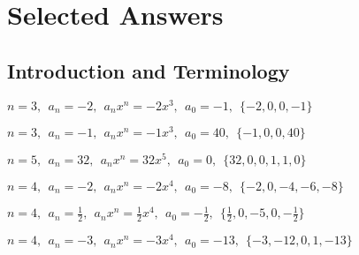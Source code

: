 \documentclass[12pt]{book}
\theoremstyle{definition}
\begin{document}
\section{Selected Answers}
\subsection*{Introduction and Terminology}
\begin{oddenumerate}
\item %
$n=3, \ \ a_n=-2, \ \  a_nx^n=-2x^3, \ \  a_0=-1, \ \  \{-2,0,0,-1\}$
\item %
$n=3, \ \  a_n=-1, \ \  a_nx^n=-1x^3, \ \  a_0=40, \ \  \{-1,0,0,40\}$
\item %
$n=5, \ \  a_n=32, \ \  a_nx^n=32x^5, \ \  a_0=0, \ \  \{32,0,0,1,1,0\}$
\item %
$n=4, \ \  a_n=-2, \ \  a_nx^n=-2x^4, \ \  a_0=-8, \ \  \{-2,0,-4,-6,-8\}$
\item %
$n=4, \ \  a_n=\frac{1}{2}, \ \  a_nx^n=\frac{1}{2}x^4, \ \  a_0=-\frac{1}{2}, \ \  \{\frac{1}{2},0,-5,0,-\frac{1}{2}\}$
\item %
$n=4, \ \  a_n=-3, \ \  a_nx^n=-3x^4, \ \  a_0=-13, \ \  \{-3,-12,0,1,-13\}$
\end{oddenumerate}
\end{document}
